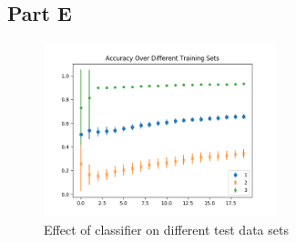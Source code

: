 \subsection{Part E}
\begin{figure}[H]
	\centering
	\includegraphics[width=0.6\textwidth]{../train2/data_sets.png}
	\caption{Effect of classifier on different test data sets}
\end{figure}